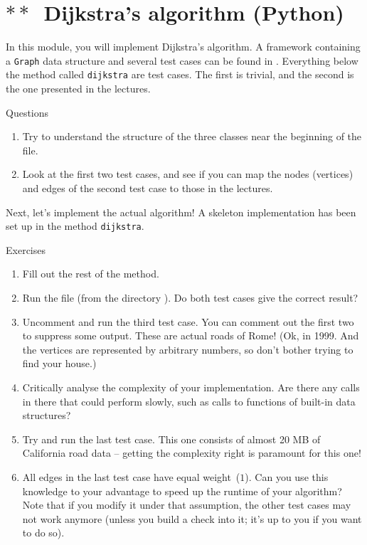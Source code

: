 \documentclass[12pt]{article}
\begin{document}
\clearpage
\section{$\ast\ast$~Dijkstra's algorithm (Python)}

In this module, you will implement Dijkstra's algorithm. A framework containing a \texttt{Graph} data structure and several test cases can be found in . Everything below the method called \texttt{dijkstra} are test cases. The first is trivial, and the second is the one presented in the lectures.
%
\begin{mybox}{Questions}
    \begin{enumerate}
        \item Try to understand the structure of the three classes near the beginning of the file.
        \item Look at the first two test cases, and see if you can map the nodes (vertices) and edges of the second test case to those in the lectures.
    \end{enumerate}
\end{mybox}

Next, let's implement the actual algorithm! A skeleton implementation has been set up in the method \texttt{dijkstra}.
%
\begin{mybox}{Exercises}
    \begin{enumerate}
        \item Fill out the rest of the method.
        \item Run the file (from the directory ). Do both test cases give the correct result?
        \item Uncomment and run the third test case. You can comment out the first two to suppress some output. These are actual roads of Rome! (Ok, in 1999. And the vertices are represented by arbitrary numbers, so don't bother trying to find your house.)
        \item Critically analyse the complexity of your implementation. Are there any calls in there that could perform slowly, such as calls to functions of built-in data structures?
        \item Try and run the last test case. This one consists of almost 20 MB of California road data -- getting the complexity right is paramount for this one!
        \item All edges in the last test case have equal weight~($1$). Can you use this knowledge to your advantage to speed up the runtime of your algorithm? Note that if you modify it under that assumption, the other test cases may not work anymore (unless you build a check into it; it's up to you if you want to do so).
    \end{enumerate}
\end{mybox}
\end{document}
